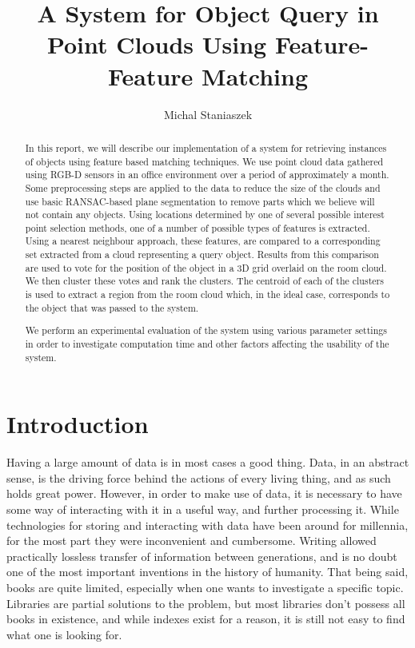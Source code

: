 \documentclass[11pt,a4paper]{kth-mag}
\author{Michal Staniaszek}
\title{A System for Object Query in Point Clouds Using Feature-Feature Matching}
\begin{document}
\maketitle
\begin{abstract}
  In this report, we will describe our implementation of a system for retrieving
  instances of objects using feature based matching techniques. We use point
  cloud data gathered using RGB-D sensors in an office environment over a period
  of approximately a month. Some preprocessing steps are applied to the data to
  reduce the size of the clouds and use basic RANSAC-based plane segmentation to
  remove parts which we believe will not contain any objects. Using locations
  determined by one of several possible interest point selection methods, one of
  a number of possible types of features is extracted. Using a nearest neighbour
  approach, these features, are compared to a corresponding set extracted from a
  cloud representing a query object. Results from this comparison are used to
  vote for the position of the object in a 3D grid overlaid on the room cloud.
  We then cluster these votes and rank the clusters. The centroid of each of the
  clusters is used to extract a region from the room cloud which, in the ideal
  case, corresponds to the object that was passed to the system.

  We perform an experimental evaluation of the system using various parameter
  settings in order to investigate computation time and other factors affecting
  the usability of the system.
\end{abstract}
\tableofcontents
\chapter{Introduction}
Having a large amount of data is in most cases a good thing. Data, in an
abstract sense, is the driving force behind the actions of every living thing,
and as such holds great power. However, in order to make use of data, it is
necessary to have some way of interacting with it in a useful way, and further
processing it. While technologies for storing and interacting with data have
been around for millennia, for the most part they were inconvenient and
cumbersome. Writing allowed practically lossless transfer of information between
generations, and is no doubt one of the most important inventions in the history
of humanity. That being said, books are quite limited, especially when one wants
to investigate a specific topic. Libraries are partial solutions to the problem,
but most libraries don't possess all books in existence, and while indexes exist
for a reason, it is still not easy to find what one is looking for.
\end{document}
